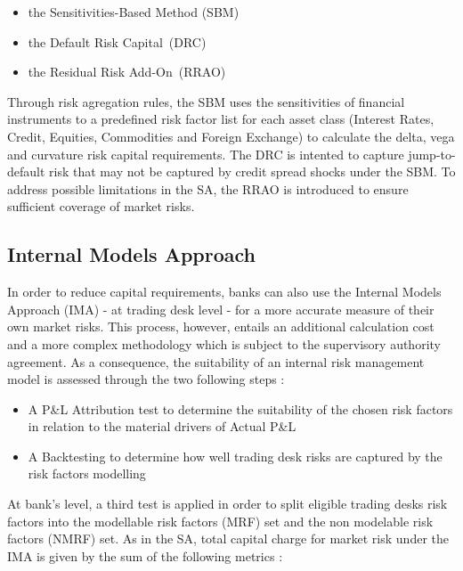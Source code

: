 \documentclass[10pt,a4paper]{report}
\begin{document}
\begin{itemize}
\item the Sensitivities-Based Method (SBM)

\item the Default Risk Capital\ (DRC)

\item the Residual Risk Add-On\ (RRAO)
\end{itemize}

\bigskip

Through risk agregation rules, the SBM uses the sensitivities of financial
instruments to a predefined risk factor list for each asset class (Interest
Rates, Credit, Equities, Commodities and Foreign Exchange) to calculate the
delta, vega and curvature risk capital requirements. The DRC is intented to
capture jump-to-default risk that may not be captured by credit spread
shocks under the SBM. To address possible limitations in the SA, the RRAO is
introduced to ensure sufficient coverage of market risks.

\bigskip 

\subsection{Internal Models Approach}

In order to reduce capital requirements, banks can also use the Internal
Models Approach (IMA) - at trading desk level - for a more accurate measure
of their own market risks. This process, however, entails an additional
calculation cost and a more complex methodology which is subject to the
supervisory authority agreement. As a consequence, the suitability of an internal risk management
model is assessed through the two following steps :

\bigskip 

\begin{itemize}
\item A P\&L Attribution test to determine the suitability of the chosen risk factors in relation to the material drivers of
Actual P\&L

\item A Backtesting to determine how well trading desk  risks  are captured  by the risk factors modelling 
\end{itemize}

\bigskip

At bank's level, a third test is applied in order to split eligible
trading desks risk factors into the modellable risk factors (MRF) set and
the non modelable risk factors (NMRF) set. As in the SA, total capital charge for market risk under the IMA is given by the sum of the following metrics : \\
\end{document}
